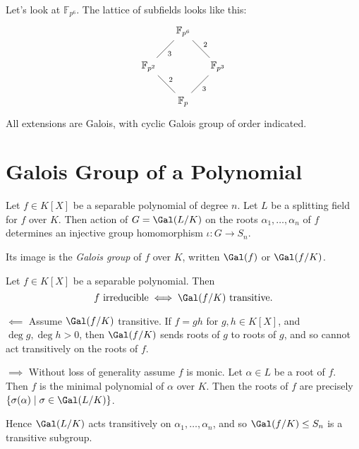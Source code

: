 \documentclass[12pt]{article}
\begin{document}
\begin{exbox}
	Let's look at $\mathbb{F}_{p^6}$. The lattice of subfields looks like this:
	\[
		\begin{tikzcd}[column sep = small]
		& \mathbb{F}_{p^6} \arrow[dl, dash, "3"] \arrow[dr, dash, "2"] & \\
		\mathbb{F}_{p^2} \arrow[dr, dash, "2"] & & \mathbb{F}_{p^3} \arrow[dl, dash, "3"] \\
						  & \mathbb{F}_p &
	\end{tikzcd}
	\]
	All extensions are Galois, with cyclic Galois group of order indicated.
\end{exbox}


\newpage

\section{Galois Group of a Polynomial}
\label{sec:gal_poly}

Let $f \in K[X]$ be a separable polynomial of degree $n$. Let $L$ be a splitting field for $f$ over $K$. Then action of $G = \Gal(L/K)$ on the roots $\alpha_1, \ldots, \alpha_n$ of $f$ determines an injective group homomorphism $\iota : G \to S_n$.

Its image is the \emph{Galois group} of $f$ over $K$, written $\Gal(f)$ or $\Gal(f/K)$.

\begin{lemma}
	Let $f \in K[X]$ be a separable polynomial. Then
	\[
		f \text{ irreducible} \iff \Gal(f/K) \text{ transitive}.
	\]
\end{lemma}

\begin{proofbox}
	

	$\impliedby$ Assume $\Gal(f/K)$ transitive. If $f = gh$ for $g, h \in K[X]$, and $\deg g, \deg h > 0$, then $\Gal(f/K)$ sends roots of $g$ to roots of $g$, and so cannot act transitively on the roots of $f$.

	$\implies$ Without loss of generality assume $f$ is monic. Let $\alpha \in L$ be a root of $f$. Then $f$ is the minimal polynomial of $\alpha$ over $K$. Then the roots of $f$ are precisely $\{\sigma(\alpha) \mid \sigma \in \Gal(L/K)\}$.

	Hence $\Gal(L/K)$ acts transitively on $\alpha_1, \ldots, \alpha_n$, and so $\Gal(f/K) \leq S_n$ is a transitive subgroup.
\end{proofbox}
\end{document}
